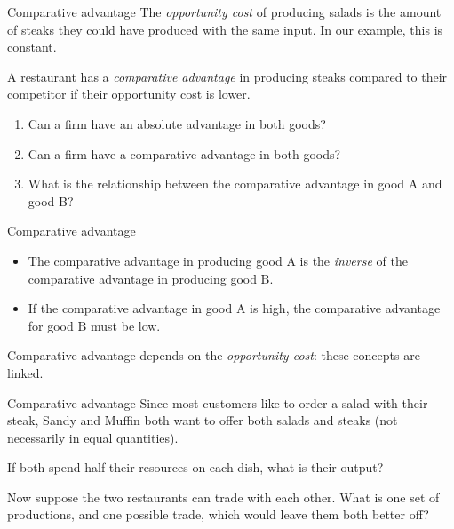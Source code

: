 \documentclass[compress]{beamer}
\begin{document}
\begin{frame}{Comparative advantage}
    The \textit{opportunity cost} of producing salads is the amount of steaks they could have produced with the same input. In our example, this is constant.

    \medskip
    
\begin{block}{}
    A restaurant has a \textit{comparative advantage} in producing steaks compared to their competitor if their opportunity cost is lower.
\end{block}

    \medskip

    \begin{enumerate}
        \item Can a firm have an absolute advantage in both goods?
        \item Can a firm have a comparative advantage in both goods?
        \item What is the relationship between the comparative advantage in good A and good B?
    \end{enumerate}
\end{frame} 

\begin{frame}{Comparative advantage}
\begin{itemize}
    \item   The comparative advantage in producing good A is the \textit{inverse} of the comparative advantage in producing good B.
    \item     If the comparative advantage in good A is high, the comparative advantage for good B must be low.

\end{itemize}

    \medskip

    Comparative advantage depends on the \textit{opportunity cost}: these concepts are linked.
\end{frame} 

\begin{frame}{Comparative advantage}
    Since most customers like to order a salad with their steak, Sandy and Muffin both want to offer both salads and steaks (not necessarily in equal quantities).

    \medskip

    If both spend half their resources on each dish, what is their output?

    \medskip

    Now suppose the two restaurants can trade with each other. What is one set of productions, and one possible trade, which would leave them both better off?

\end{frame} 
\end{document}
